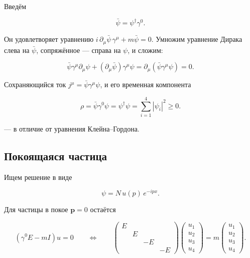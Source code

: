 \documentclass[../final.tex]{subfiles}
\begin{document}
Введём 

\begin{equation*}
    \bar\psi=\psi^\dagger\gamma^0.
\end{equation*}

Он удовлетворяет уравнению
$i\,\partial_\mu\bar\psi\,\gamma^\mu+m\bar\psi=0$.
Умножим уравнение Дирака слева на $\bar\psi$, сопряжённое ---
справа на $\psi$, и сложим:

\begin{equation*}
    \bar\psi\gamma^\mu\partial_\mu\psi
    +
    \left(\partial_\mu\bar\psi\right)\gamma^\mu\psi
    =
    \partial_\mu\left(\bar\psi\gamma^\mu\psi\right)
    =
    0.
\end{equation*}

Сохраняющийся ток $j^\mu=\bar\psi\gamma^\mu\psi$, и его
временная компонента

\begin{equation*}
    \rho
    =
    \bar\psi\gamma^0\psi
    =
    \psi^\dagger\psi
    =
    \sum_{i=1}^{4}|\psi_i|^2
    \geqslant0.
\end{equation*}

 --- в отличие
от уравнения Клейна--Гордона.


\subsection{Покоящаяся частица}

Ищем решение в виде

\begin{equation*}
    \psi=N\,u(p)\,e^{-ipx}.
\end{equation*}

Для частицы в покое $\mathbf p=0$ остаётся

\begin{equation*}
    \left(\gamma^0E-mI\right)u=0
    \qquad\Longleftrightarrow\qquad
    \begin{pmatrix}
        E & & & \\
         & E & & \\
         & & -E & \\
         & & & -E
    \end{pmatrix}
    \begin{pmatrix}
        u_1\\ u_2\\ u_3\\ u_4
    \end{pmatrix}
    =
    m
    \begin{pmatrix}
        u_1\\ u_2\\ u_3\\ u_4
    \end{pmatrix}.
\end{equation*}
\end{document}
